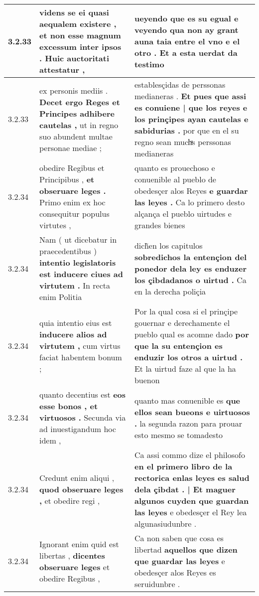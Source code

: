 \begin{tabular}{|p{1cm}|p{6.5cm}|p{6.5cm}|}
3.2.33 & videns se ei quasi aequalem existere , \textbf{ et non esse magnum excessum inter ipsos . } Huic auctoritati attestatur , & ueyendo que es su egual e veyendo \textbf{ qua non ay grant auna taia entre el vno e el otro . } Et a esta uerdat da testimo \\\hline
3.2.33 & ex personis mediis . \textbf{ Decet ergo Reges et Principes adhibere cautelas , } ut in regno suo abundent multae personae mediae ; & establesçidas de perssonas medianeras . \textbf{ Et pues que assi es conuiene | que los reyes e los prinçipes ayan cautelas e sabidurias . } por que en el su regno sean muchͣs perssonas medianeras \\\hline
3.2.34 & obedire Regibus et Principibus , \textbf{ et obseruare leges . } Primo enim ex hoc consequitur populus virtutes , & quanto es prouechoso e conuenible al pueblo de obedesçer alos Reyes \textbf{ e guardar las leyes . } Ca lo primero desto alçança el pueblo uirtudes e grandes bienes \\\hline
3.2.34 & Nam ( ut dicebatur in praecedentibus ) \textbf{ intentio legislatoris est inducere ciues ad virtutem . } In recta enim Politia & dich̃en los capitulos \textbf{ sobredichos la entençion del ponedor dela ley es enduzer los çibdadanos o uirtud . } Ca en la derecha poliçia \\\hline
3.2.34 & quia intentio eius est \textbf{ inducere alios ad virtutem , } cum virtus faciat habentem bonum ; & Por la qual cosa si el prinçipe gouernar e derechamente el pueblo qual es acomne dado \textbf{ por que la su entençion es enduzir los otros a uirtud . } Et la uirtud faze al que la ha buenon \\\hline
3.2.34 & quanto decentius est \textbf{ eos esse bonos , et virtuosos . } Secunda via ad inuestigandum hoc idem , & quanto mas conuenible es \textbf{ que ellos sean bueons e uirtuosos . } la segunda razon para prouar esto mesmo se tomadesto \\\hline
3.2.34 & Credunt enim aliqui , \textbf{ quod obseruare leges , } et obedire regi , & Ca assi commo dize el philosofo \textbf{ en el primero libro de la rectorica enlas leyes es salud dela çibdat . | Et maguer algunos cuyden que guardan las leyes } e obedesçer el Rey lea algunasiudunbre . \\\hline
3.2.34 & Ignorant enim quid est libertas , \textbf{ dicentes obseruare leges } et obedire Regibus , & Ca non saben que cosa es libertad \textbf{ aquellos que dizen que guardar las leyes } e obedesçer alos Reyes es seruidunbre . \\\hline

\end{tabular}
